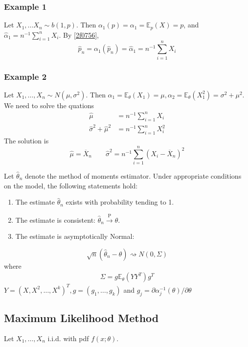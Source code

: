 \subsubsection{Example 1}

Let $X_1,\dots X_n\sim b(1,p)$. Then $\alpha_1(p)=\alpha_1=\mathbb{E}_{p}(X)=p$, and $\widehat{\alpha}_{1}=n^{-1}\sum_{i=1}^{n}X_i$. By \cref{2f0756},
\[
\widehat{p}_n=\alpha_1(\widehat{p}_n)=\widehat{\alpha}_{1}=n^{-1}\sum_{i=1}^{n} X_i
\]
\subsubsection{Example 2}

Let $X_1,\dots,X_n\sim N(\mu,\sigma^{2})$. Then $\alpha_1=\mathbb{E}_{\theta}(X_1)=\mu,\alpha_2=\mathbb{E}_{\theta}(X^2_{1})=\sigma^{2}+\mu^{2}$. We need to solve the quations
\[
\begin{aligned}
\widehat{\mu} & =n^{-1}\sum_{i=1}^{n} X_i \\
\widehat{\sigma}^2+\widehat{\mu}^2 & =n^{-1}\sum_{i=1}^{n} X_i^2
\end{aligned}
\]
The solution is
\[
\widehat{\mu}=\overline{X}_n \qquad \widehat{\sigma}^2=n^{-1}\sum_{i=1}^{n} (X_i-\overline{X}_n)^2
\]
\begin{theorem}[Theorem 9.6]
Let $\widehat{\theta}_n$ denote the method of moments estimator. Under appropriate conditions on the model, the following statements hold:
	\begin{enumerate}
		\item The estimate $\widehat{\theta}_n$ exists with probability tending to 1.
		\item The estimate is consistent: $\widehat{\theta}_n \xrightarrow{\mathrm{P}} \theta$.
		\item The estimate is asymptotically Normal:
	\end{enumerate}
\[
\sqrt{n}\left(\widehat{\theta}_n-\theta\right) \rightsquigarrow N(0, \Sigma)
\]where
\[
\begin{gathered}
\Sigma=g \mathbb{E}_\theta\left(Y Y^T\right) g^T 
\end{gathered}
\]$Y=\left(X, X^2, \ldots, X^k\right)^T, g=\left(g_1, \ldots, g_k\right)$ and $g_j=\partial \alpha_j^{-1}(\theta) / \partial \theta$
\end{theorem}
\subsection{Maximum Likelihood Method}

Let $X_1,\dots,X_n$ i.i.d. with pdf $f(x;\theta)$.

